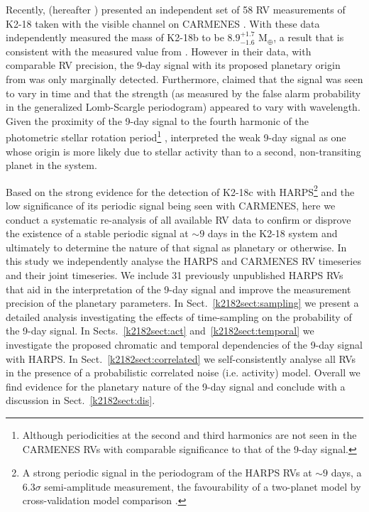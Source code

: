 Recently, \cite{sarkis18} (hereafter )
presented an independent set of 58 RV measurements of K2-18 taken with the visible
channel on CARMENES \citep[561--905 nm;][]{quirrenbach14}.
With these data  independently measured the
mass of K2-18b to be $8.9^{+1.7}_{-1.6}$ M$_{\oplus}$, a result that is consistent with the measured value from
. However in their data, with comparable RV precision, the 9-day signal with its
proposed planetary origin from  was only marginally detected. Furthermore,
 claimed that the signal was seen to vary in time and that the strength (as measured by
the false alarm probability in the generalized Lomb-Scargle periodogram) appeared to vary with
wavelength. Given the proximity of the 9-day signal to the fourth harmonic of the photometric stellar
rotation period\footnote{Although periodicities at the second and third harmonics are not seen in the CARMENES
  RVs with comparable significance to that of the 9-day signal.} , 
 interpreted the weak 9-day signal as one whose origin is more
likely due to stellar activity than to a second, non-transiting planet in the system. 

Based on the strong evidence for the detection of K2-18c with HARPS\footnote{A strong
  periodic signal in the periodogram of the HARPS RVs at $\sim 9$ days, a $6.3\sigma$ semi-amplitude measurement,
  the favourability of a two-planet model by cross-validation model comparison .} and the
low significance of its periodic signal being seen with CARMENES, here we conduct a systematic re-analysis of all 
available RV data to confirm or disprove the existence of a stable periodic signal at $\sim 9$ days in the K2-18
system and ultimately to determine the nature of that signal as planetary or otherwise. In this study we
independently analyse the  HARPS and CARMENES RV timeseries and their joint timeseries.
We include 31 previously unpublished HARPS RVs that aid in the interpretation
of the 9-day signal and improve the measurement precision of the planetary parameters.
In Sect.~\ref{k2182sect:sampling} we present a detailed analysis investigating the effects of
time-sampling on the probability of the 9-day signal.
In Sects.~\ref{k2182sect:act} and~\ref{k2182sect:temporal} we investigate the proposed chromatic and temporal dependencies
of the 9-day signal with HARPS. In Sect.~\ref{k2182sect:correlated} we self-consistently analyse all RVs in
the presence of a probabilistic correlated noise (i.e. activity) model.
Overall we find evidence for the planetary nature of the 9-day signal and conclude with a discussion in
Sect.~\ref{k2182sect:dis}.

